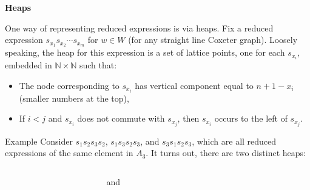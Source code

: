 \documentclass[9pt,handout]{beamer}
\newcommand{\<}{\langle}
\renewcommand{\>}{\rangle}
\begin{document}

\begin{frame}{\textbf{Heaps}}\pause

One way of representing reduced expressions is via \alert{heaps}.  Fix a reduced expression $s_{x_1}s_{x_2}\cdots s_{x_m}$ for $w\in W$ (for any straight line Coxeter graph).  \pause Loosely speaking, the heap for this expression is a set of lattice points, one for each $s_{x_{i}}$, embedded in $\mathbb{N}\times \mathbb{N}$ such that: \pause

\begin{itemize}
\item The node corresponding to $s_{x_{i}}$ has vertical component equal to $n+1-x_{i}$ (smaller numbers at the top), \pause
\item If $i<j$ and $s_{x_{i}}$ does not commute with $s_{x_{j}}$, then $s_{x_{i}}$ occurs to the left of $s_{x_{j}}$.
\end{itemize}

\pause

\begin{block}{Example}
Consider {\color{blue!60}$s_{1}s_{2}s_{3}s_{2}$}, {\color{red}$s_{1}s_{3}s_{2}s_{3}$}, and {\color{red}$s_{3}s_{1}s_{2}s_{3}$}, which are all reduced expressions of the same element in $A_{3}$.  \pause It turns out, there are two distinct heaps:
\begin{columns}
\begin{column}{.4\linewidth}
\begin{center}
\end{center}
\end{column}

\begin{column}{.1\linewidth}
\begin{center}
and
\end{center}
\end{column}

\begin{column}{.4\linewidth}
\begin{center}
\end{center}
\end{column}
\end{columns}
\end{block}


\end{frame}
\end{document}
